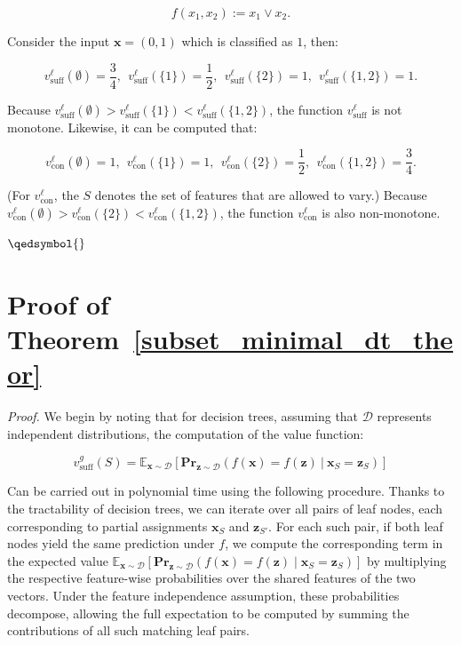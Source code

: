 \documentclass{article}
\newcommand{\z}{\textbf{z}}
\newcommand{\x}{\textbf{x}}
\begin{document}
\begin{equation}
f(x_1,x_2) := x_1 \lor x_2.
\end{equation}


Consider the input $\x = (0,1)$ which is classified as $1$, then:

\begin{equation}
v^{\ell}_{\text{suff}}(\emptyset) = \frac{3}{4},~~v^{\ell}_{\text{suff}}(\{1\}) = \frac{1}{2},~~v^{\ell}_{\text{suff}}(\{2\}) = 1,~~v^{\ell}_{\text{suff}}(\{1,2\}) = 1.
\end{equation}

Because $v^{\ell}_{\text{suff}}(\emptyset) > v^{\ell}_{\text{suff}}(\{1\}) < v^{\ell}_{\text{suff}}(\{1,2\})$, the function $v^{\ell}_{\text{suff}}$ is not monotone. Likewise, it can be computed that:

\begin{equation}
v^{\ell}_{\text{con}}(\emptyset) = 1,~~v^{\ell}_{\text{con}}(\{1\}) = 1,~~v^{\ell}_{\text{con}}(\{2\}) = \frac{1}{2},~~v^{\ell}_{\text{con}}(\{1,2\}) = \frac{3}{4}.
\end{equation}

(For $v^{\ell}_{\text{con}}$, the $S$ denotes the set of features that are allowed to vary.)
Because $v^{\ell}_{\text{con}}(\emptyset) > v^{\ell}_{\text{con}}(\{2\}) < v^{\ell}_{\text{con}}(\{1,2\})$, the function $v^{\ell}_{\text{con}}$ is also non-monotone.


$\qedsymbol{}$



\section{Proof of Theorem~\ref{subset_minimal_dt_theor}}
\label{subset_minimal_dt_theor_sec}

\subsetminimaldt*

\emph{Proof.} We begin by noting that for decision trees, assuming that $\mathcal{D}$ represents independent distributions, the computation of the value function:

\begin{equation}
v^g_{\text{suff}}(S)=\mathbb{E}_{\x\sim\mathcal{D}}[
\textbf{Pr}_{\z\sim\mathcal{D}}(f(\x)=f(\z) \ | \ \x_S=\z_S)]
\end{equation}


Can be carried out in polynomial time using the following procedure. Thanks to the tractability of decision trees, we can iterate over all pairs of leaf nodes, each corresponding to partial assignments $\x_S$ and $\z_{S'}$. For each such pair, if both leaf nodes yield the same prediction under $f$, we compute the corresponding term in the expected value $\mathbb{E}_{\x\sim\mathcal{D}}[
\textbf{Pr}_{\z\sim\mathcal{D}}(f(\x)=f(\z) \mid \x_S=\z_S)]$ by multiplying the respective feature-wise probabilities over the shared features of the two vectors. Under the feature independence assumption, these probabilities decompose, allowing the full expectation to be computed by summing the contributions of all such matching leaf pairs.
\end{document}

